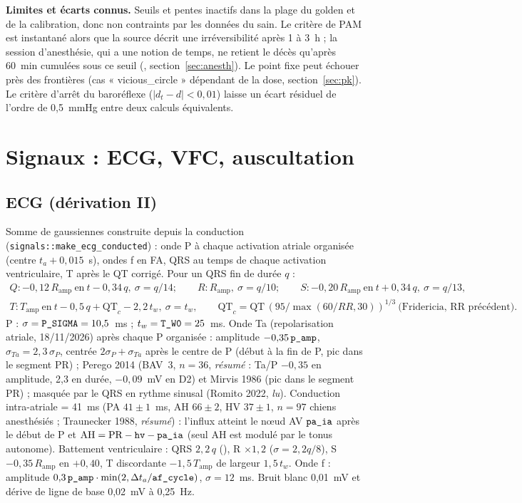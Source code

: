 \documentclass[10pt,a4paper]{article}
\newcommand{\cmd}[1]{\texttt{#1}}
\newcommand{\vp}[1]{\text{\texttt{\detokenize{#1}}}}
\newcommand{\acc}[1]{\textsl{#1}}
\newcommand{\limite}[1]{\par\textbf{Limites et écarts connus.} #1}
\begin{document}
\limite{Seuils et pentes inactifs dans la plage du golden et de la calibration, donc non contraints par les données du sain. Le critère de PAM est instantané alors que la source décrit une irréversibilité après 1 à 3~h ; la session d'anesthésie, qui a une notion de temps, ne retient le décès qu'après 60~min cumulées sous ce seuil (\vp{shock_tol_min}, section~\ref{sec:anesth}). Le point fixe peut échouer près des frontières (cas « vicious\_circle » dépendant de la dose, section~\ref{sec:pk}). Le critère d'arrêt du baroréflexe ($|d_t - d| < 0{,}01$) laisse un écart résiduel de l'ordre de 0,5~mmHg entre deux calculs équivalents.}

\section{Signaux : ECG, VFC, auscultation}\label{sec:signaux}

\subsection{ECG (dérivation II)}
Somme de gaussiennes construite depuis la conduction (\cmd{signals::make\_ecg\_conducted}) : onde P à chaque activation atriale organisée (centre $t_a + 0{,}015$~s), ondes f en FA, QRS au temps de chaque activation ventriculaire, T après le QT corrigé. Pour un QRS fin de durée $q$ :
\begin{gather}
Q : -0{,}12\,R_\text{amp}\ \text{en}\ t - 0{,}34\,q,\ \sigma = q/14;\qquad R : R_\text{amp},\ \sigma = q/10;\qquad S : -0{,}20\,R_\text{amp}\ \text{en}\ t + 0{,}34\,q,\ \sigma = q/13,\\
T : T_\text{amp}\ \text{en}\ t - 0{,}5\,q + \text{QT}_c - 2{,}2\,t_w,\ \sigma = t_w,\qquad \text{QT}_c = \text{QT}\,(95/\max(60/RR, 30))^{1/3}\ \text{(Fridericia, RR précédent)}.
\end{gather}
P : $\sigma = \vp{P_SIGMA} = 10{,}5$~ms ; $t_w = \vp{T_W0} = 25$~ms. Onde Ta (repolarisation atriale, 18/11/2026) après chaque P organisée : amplitude $-0{,}35\,\vp{p_amp}$, $\sigma_{Ta} = 2{,}3\,\sigma_P$, centrée $2\sigma_P + \sigma_{Ta}$ après le centre de P (début à la fin de P, pic dans le segment PR) ; Perego 2014 (BAV~3, $n = 36$, \acc{résumé} : Ta/P $-0{,}35$ en amplitude, 2,3 en durée, $-0{,}09$~mV en D2) et Mirvis 1986 (pic dans le segment PR) ; masquée par le QRS en rythme sinusal (Romito 2022, \acc{lu}). Conduction intra-atriale \vp{pa_ia} = 41~ms (PA $41 \pm 1$~ms, AH $66 \pm 2$, HV $37 \pm 1$, $n = 97$ chiens anesthésiés ; Traunecker 1988, \acc{résumé}) : l'influx atteint le nœud AV $\vp{pa_ia}$ après le début de P et $\text{AH} = \text{PR} - \vp{hv} - \vp{pa_ia}$ (seul AH est modulé par le tonus autonome). Battement ventriculaire : QRS $2{,}2\,q$ (\vp{WIDE_QRS}), R $\times 1{,}2$ ($\sigma = 2{,}2q/8$), S $-0{,}35\,R_\text{amp}$ en $+0{,}40$, T discordante $-1{,}5\,T_\text{amp}$ de largeur $1{,}5\,t_w$. Onde f : amplitude $0{,}3\,\vp{p_amp}\cdot\min(2, \Delta t_a/\vp{af_cycle})$, $\sigma = 12$~ms. Bruit blanc 0,01~mV et dérive de ligne de base 0,02~mV à 0,25~Hz.
\end{document}
